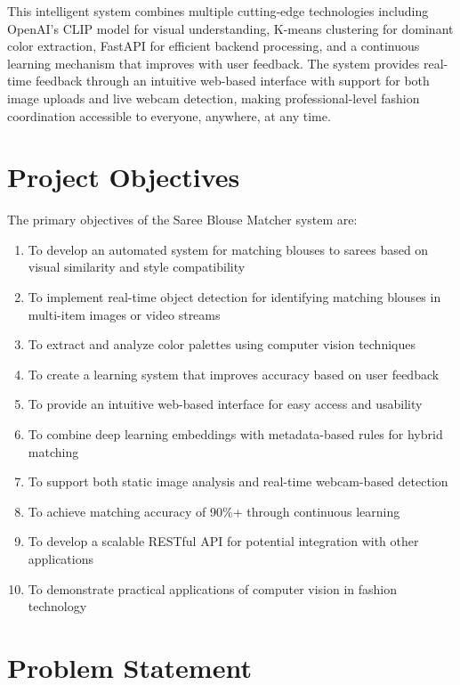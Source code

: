 \documentclass[12pt,a4paper]{report}
\begin{document}
This intelligent system combines multiple cutting-edge technologies including OpenAI's CLIP model for visual understanding, K-means clustering for dominant color extraction, FastAPI for efficient backend processing, and a continuous learning mechanism that improves with user feedback. The system provides real-time feedback through an intuitive web-based interface with support for both image uploads and live webcam detection, making professional-level fashion coordination accessible to everyone, anywhere, at any time.

\section{Project Objectives}

The primary objectives of the Saree Blouse Matcher system are:

\begin{enumerate}
    \item To develop an automated system for matching blouses to sarees based on visual similarity and style compatibility
    \item To implement real-time object detection for identifying matching blouses in multi-item images or video streams
    \item To extract and analyze color palettes using computer vision techniques
    \item To create a learning system that improves accuracy based on user feedback
    \item To provide an intuitive web-based interface for easy access and usability
    \item To combine deep learning embeddings with metadata-based rules for hybrid matching
    \item To support both static image analysis and real-time webcam-based detection
    \item To achieve matching accuracy of 90\%+ through continuous learning
    \item To develop a scalable RESTful API for potential integration with other applications
    \item To demonstrate practical applications of computer vision in fashion technology
\end{enumerate}

\section{Problem Statement}
\end{document}
